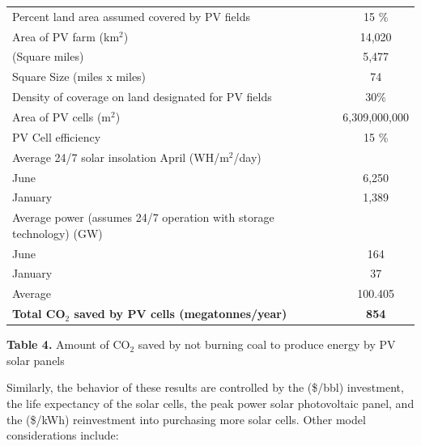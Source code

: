 \documentclass[11pt]{article}
\begin{document}
\begin{center}
\begin{tabular}{|l|c|}
\hline
\cellcolor[gray]{0.8}{\bf Description} & \cellcolor[gray]{0.8}{\bf Value} \\
\hline
Percent land area assumed covered by PV fields & 15 \% \\ 
\hline
Area of PV farm (km$^2$) & 14,020 \\
\hline
\hspace{24.5em} (Square miles) & 5,477 \\
\hline
\hspace{19em} Square Size (miles x miles) & 74 \\
\hline
Density of coverage on land designated  for PV fields & 30\% \\
\hline
Area of PV cells (m$^2$) &  6,309,000,000 \\ 
\hline
PV Cell efficiency & 15 \% \\
\hline
Average 24/7 solar insolation April (WH/m$^2$/day) &  \\
\hline
\hspace{29.5em}June & 6,250 \\
\hline
\hspace{28em}January & 1,389 \\
\hline
Average power (assumes 24/7 operation with storage technology) (GW) & \\
\hline
\hspace{29.5em}June & 164 \\
\hline
\hspace{28em}January & 37 \\
\hline
\hspace{28em}Average & 100.405 \\
\hline  
{\bf Total CO$_2$ saved by PV cells (megatonnes/year)} & {\bf 854} \\
\hline
\end{tabular}
\end{center}

\begin{center}
{\bf Table 4.} Amount of CO$_2$ saved by not burning coal to produce energy by PV solar panels
\end{center}

Similarly, the behavior of these results are controlled by the (\$/bbl) investment, the life expectancy of the solar cells, the peak power solar photovoltaic panel, and the (\$/kWh) reinvestment into purchasing more solar cells. Other model considerations include:
\end{document}
